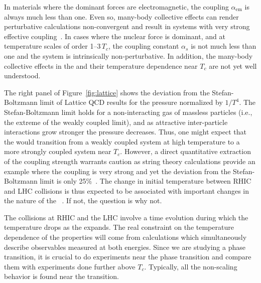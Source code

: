 In materials where the dominant forces are electromagnetic, the
coupling $\alpha_{\mathrm{em}}$ is always much less than one.  Even so,
many-body collective effects can render perturbative calculations
non-convergent and result in systems with very strong
effective coupling~\cite{Adams:2012th}.  In cases where the nuclear force is
dominant, and at temperature scales of order 1--3\,$T_{c}$, the
coupling constant $\alpha_{s}$ is not much less than one and the
system is intrinsically non-perturbative.  In addition, the many-body
collective effects in the \qgp and their temperature dependence near
$T_{c}$ are not yet well understood.

The right panel of Figure~\ref{fig:lattice} shows the deviation from
the Stefan-Boltzmann limit of Lattice QCD results for the pressure
normalized by $1/T^{4}$.  The Stefan-Boltzmann limit holds for a
non-interacting gas of massless particles (i.e., the extreme of the
weakly coupled limit), and as attractive inter-particle interactions
grow stronger the pressure decreases.  Thus, one might expect that the
\qgp would transition from a weakly coupled system at high temperature
to a more strongly coupled system near $T_{c}$.  However, a direct
quantitative extraction of the coupling strength warrants caution as
string theory calculations provide an example where the coupling is
very strong and yet the deviation from the Stefan-Boltzmann limit is
only 25\%~\cite{Gubser:2009fc,Gubser:1996de}.  The change in initial
temperature between RHIC and LHC collisions is thus expected to be
associated with important changes in the nature of the
\qgp~\cite{Wiedemann:2009sa}.  If not, the question is why not.

The collisions at RHIC and the LHC involve a time evolution during
which the temperature drops as the \qgp expands.  The real constraint
on the temperature dependence of the \qgp properties will come from
calculations which simultaneously describe observables measured at both energies.
Since we are studying a phase transition, it is crucial to do
experiments near the phase transition and compare them with
experiments done further above $T_c$.  Typically, all the non-scaling
behavior is found near the transition.

